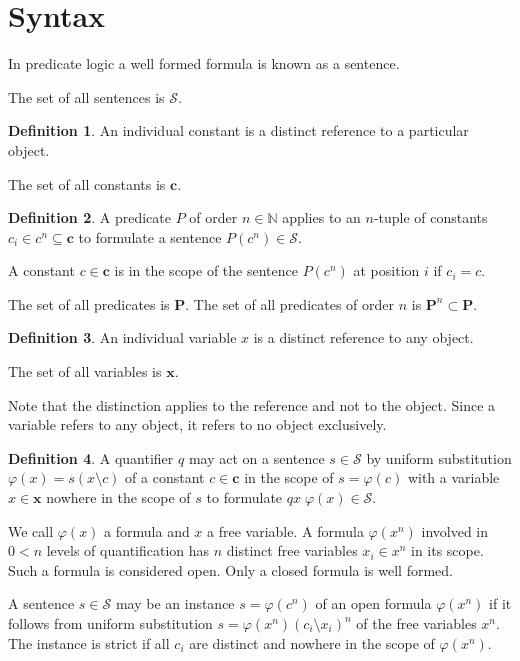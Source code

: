 \documentclass{amsbook}
\theoremstyle{definition}
\newtheorem{dfn}{Definition}[section]
\begin{document}
\section{Syntax}

In predicate logic a well formed formula is known as a sentence.

The set of all sentences is $\mathcal S$.

\begin{dfn}
    An individual constant is a distinct reference to a particular object.

    The set of all constants is $\mathbf c$.
\end{dfn}

\begin{dfn}
    A predicate $P$ of order $n \in \mathbb N$ applies to an $n$-tuple of constants $c_i \in c^n \subseteq \mathbf c$ to formulate a sentence $P(c^n) \in \mathcal S$.

    A constant $c \in \mathbf c$ is in the scope of the sentence $P(c^n)$ at position $i$ if $c_i = c$.

    The set of all predicates is $\mathbf P$. The set of all predicates of order $n$ is $\mathbf P^n \subset \mathbf P$.
\end{dfn}

\begin{dfn}
    An individual variable $x$ is a distinct reference to any object.

    The set of all variables is $\mathbf x$.
\end{dfn}

Note that the distinction applies to the reference and not to the object. Since a variable refers to any object, it refers to no object exclusively.

\begin{dfn}
    A quantifier $q$ may act on a sentence $s \in \mathcal S$ by uniform substitution $\varphi(x) = s(x \setminus c)$ of a constant $c \in \mathbf c$ in the scope of $s = \varphi(c)$ with a variable $x \in \mathbf x$ nowhere in the scope of $s$ to formulate $qx\;\varphi(x) \in \mathcal S$.

    We call $\varphi(x)$ a formula and $x$ a free variable. A formula $\varphi(x^n)$ involved in $0 < n$ levels of quantification has $n$ distinct free variables $x_i \in x^n$ in its scope. Such a formula is considered open. Only a closed formula is well formed.

    A sentence $s \in \mathcal S$ may be an instance $s = \varphi(c^n)$ of an open formula $\varphi(x^n)$ if it follows from uniform substitution $s = \varphi(x^n)(c_i \setminus x_i)^n$ of the free variables $x^n$. The instance is strict if all $c_i$ are distinct and nowhere in the scope of $\varphi(x^n)$.
\end{dfn}
\end{document}
